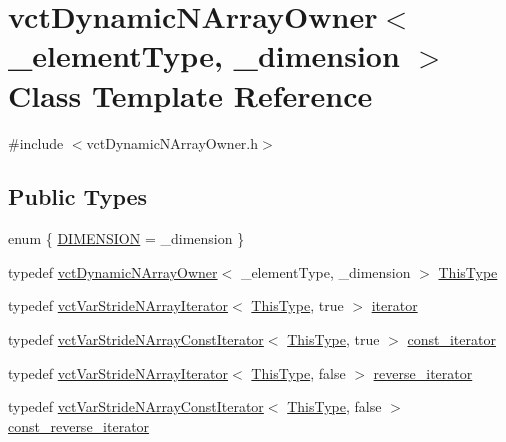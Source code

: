 \hypertarget{classvct_dynamic_n_array_owner}{}\section{vct\+Dynamic\+N\+Array\+Owner$<$ \+\_\+element\+Type, \+\_\+dimension $>$ Class Template Reference}
\label{classvct_dynamic_n_array_owner}


{\ttfamily \#include $<$vct\+Dynamic\+N\+Array\+Owner.\+h$>$}

\subsection*{Public Types}
\begin{DoxyCompactItemize}
\item 
enum \{ \hyperlink{classvct_dynamic_n_array_owner_a0f4131a70f9365b60085fd16ce0e2f69a095e29919b35ca1549f2ff0d092d9116}{D\+I\+M\+E\+N\+S\+I\+O\+N} = \+\_\+dimension
 \}
\item 
typedef \hyperlink{classvct_dynamic_n_array_owner}{vct\+Dynamic\+N\+Array\+Owner}$<$ \+\_\+element\+Type, \+\_\+dimension $>$ \hyperlink{classvct_dynamic_n_array_owner_ad221bdc6a1c33632b48777a685da9036}{This\+Type}
\item 
typedef \hyperlink{classvct_var_stride_n_array_iterator}{vct\+Var\+Stride\+N\+Array\+Iterator}$<$ \hyperlink{classvct_dynamic_n_array_owner_ad221bdc6a1c33632b48777a685da9036}{This\+Type}, true $>$ \hyperlink{classvct_dynamic_n_array_owner_a48e740eae5c0a1654e5e93b12d388c19}{iterator}
\item 
typedef \hyperlink{classvct_var_stride_n_array_const_iterator}{vct\+Var\+Stride\+N\+Array\+Const\+Iterator}$<$ \hyperlink{classvct_dynamic_n_array_owner_ad221bdc6a1c33632b48777a685da9036}{This\+Type}, true $>$ \hyperlink{classvct_dynamic_n_array_owner_a81e092a15fe8a5bf0777a8b1f9cc8e4a}{const\+\_\+iterator}
\item 
typedef \hyperlink{classvct_var_stride_n_array_iterator}{vct\+Var\+Stride\+N\+Array\+Iterator}$<$ \hyperlink{classvct_dynamic_n_array_owner_ad221bdc6a1c33632b48777a685da9036}{This\+Type}, false $>$ \hyperlink{classvct_dynamic_n_array_owner_a9b4b9b8c6f7e3cfe9bdf9aedbdda6f0d}{reverse\+\_\+iterator}
\item 
typedef \hyperlink{classvct_var_stride_n_array_const_iterator}{vct\+Var\+Stride\+N\+Array\+Const\+Iterator}$<$ \hyperlink{classvct_dynamic_n_array_owner_ad221bdc6a1c33632b48777a685da9036}{This\+Type}, false $>$ \hyperlink{classvct_dynamic_n_array_owner_a3c8cf0902cf51a404fc00cee4aac3f46}{const\+\_\+reverse\+\_\+iterator}
\end{DoxyCompactItemize}
